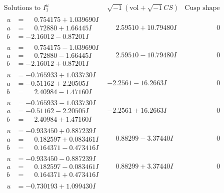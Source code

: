 \documentclass[1p]{elsarticle_modified}
\theoremstyle{definition}
\newcommand{\I}{\sqrt{-1}}
\begin{document}
$$\begin{array}{c|c|c}
\text{Solutions to }I^u_{1}& \I (\text{vol} + \sqrt{-1}CS) & \text{Cusp shape}\\
 \hline 
\begin{aligned}
u &= \phantom{-}0.754175 + 1.039690 I \\
a &= \phantom{-}0.72880 + 1.66445 I \\
b &= -2.16012 - 0.87201 I\end{aligned}
 & \phantom{-}2.59510 + 10.79480 I & \phantom{-0.000000 } 0 \\ \hline\begin{aligned}
u &= \phantom{-}0.754175 - 1.039690 I \\
a &= \phantom{-}0.72880 - 1.66445 I \\
b &= -2.16012 + 0.87201 I\end{aligned}
 & \phantom{-}2.59510 - 10.79480 I & \phantom{-0.000000 } 0 \\ \hline\begin{aligned}
u &= -0.765933 + 1.033730 I \\
a &= -0.51162 + 2.20505 I \\
b &= \phantom{-}2.40984 - 1.47160 I\end{aligned}
 & -2.2561 - 16.2663 I & \phantom{-0.000000 } 0 \\ \hline\begin{aligned}
u &= -0.765933 - 1.033730 I \\
a &= -0.51162 - 2.20505 I \\
b &= \phantom{-}2.40984 + 1.47160 I\end{aligned}
 & -2.2561 + 16.2663 I & \phantom{-0.000000 } 0 \\ \hline\begin{aligned}
u &= -0.933450 + 0.887239 I \\
a &= \phantom{-}0.182597 + 0.083461 I \\
b &= \phantom{-}0.164371 - 0.473416 I\end{aligned}
 & \phantom{-}0.88299 - 3.37440 I & \phantom{-0.000000 } 0 \\ \hline\begin{aligned}
u &= -0.933450 - 0.887239 I \\
a &= \phantom{-}0.182597 - 0.083461 I \\
b &= \phantom{-}0.164371 + 0.473416 I\end{aligned}
 & \phantom{-}0.88299 + 3.37440 I & \phantom{-0.000000 } 0 \\ \hline\begin{aligned}
u &= -0.730193 + 1.099430 I \\

\end{aligned}
\end{array}$$
\end{document}
